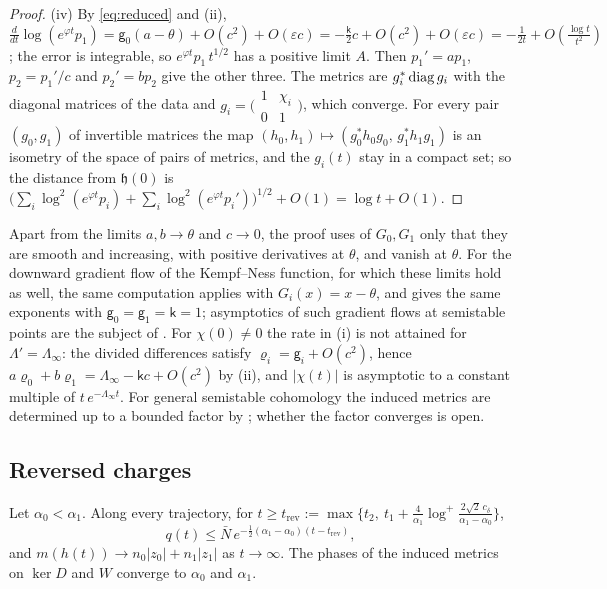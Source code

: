 \begin{proof}
(iv) By \eqref{eq:reduced} and (ii),
$\frac d{dt}\log(e^{\varphi t}p_1)=\mathsf g_0(a-\theta)+O(c^2)+O(\varepsilon c)
=-\frac{\mathsf k}2c+O(c^2)+O(\varepsilon c)=-\frac1{2t}+O(\frac{\log t}{t^2})$;
the error is integrable, so $e^{\varphi t}p_1\,t^{1/2}$ has a positive limit
$A$. Then $p_1'=ap_1$, $p_2=p_1'/c$ and $p_2'=bp_2$ give the other three. The
metrics are $g_i^*\operatorname{diag} g_i$ with the diagonal matrices of the data and
$g_i=\bigl(\begin{smallmatrix}1&\chi_i\\0&1\end{smallmatrix}\bigr)$, which
converge. For every pair $(g_0,g_1)$ of invertible matrices the map
$(h_0,h_1)\mapsto(g_0^*h_0g_0,\,g_1^*h_1g_1)$ is an isometry of the space of
pairs of metrics, and the $g_i(t)$ stay in a compact set; so the distance
from $\mathfrak h(0)$ is
$\bigl(\sum_i\log^2(e^{\varphi t}p_i)+\sum_i\log^2(e^{\varphi t}p_i')\bigr)^{1/2}+O(1)
=\log t+O(1)$.
\end{proof}

\begin{remark}\label{rem:semistable}
Apart from the limits $a,b\to\theta$ and $c\to0$, the proof uses of
$G_0,G_1$ only that they are smooth and increasing, with positive
derivatives at $\theta$, and vanish at $\theta$. For the downward gradient
flow of the Kempf--Ness function, for which these limits hold as well, the
same computation applies with $G_i(x)=x-\theta$, and gives the same exponents
with $\mathsf g_0=\mathsf g_1=\mathsf k=1$; asymptotics of such gradient flows
at semistable points are the subject of \cite{hkkp23}. For $\chi(0)\neq0$ the rate in (i) is
not attained for $\Lambda'=\Lambda_\infty$: the divided differences satisfy
$\varrho_i=\mathsf g_i+O(c^2)$, hence
$a\varrho_0+b\varrho_1=\Lambda_\infty-\mathsf kc+O(c^2)$ by (ii), and $|\chi(t)|$
is asymptotic to a constant multiple of $t\,e^{-\Lambda_\infty t}$. For
general semistable cohomology the induced metrics are determined up to a
bounded factor by \cite[Theorem~6.3 and Corollary~6.5]{wue26b}; whether the
factor converges is open.
\end{remark}

\subsection{Reversed charges}

\begin{theorem}\label{thm:reversed}
Let $\alpha_0<\alpha_1$. Along every trajectory, for
$t\geq t_{\mathrm{rev}}:=\max\bigl\{t_2,\ t_1+\frac4{\alpha_1}\log^+\frac{2\sqrt2\,c_\delta}{\alpha_1-\alpha_0}\bigr\}$,
\[
 q(t)\leq\bar N\,e^{-\frac12(\alpha_1-\alpha_0)(t-t_{\mathrm{rev}})} ,
\]
and $m(h(t))\to n_0|z_0|+n_1|z_1|$ as $t\to\infty$. The phases of the induced
metrics on $\ker D$ and $W$ converge to $\alpha_0$ and $\alpha_1$.
\end{theorem}

